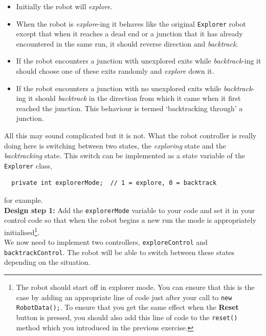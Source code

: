 \begin{itemize}

\item
Initially the robot will {\em explore}.

\item
When the robot is {\em explore}-ing it behaves like the original
{\tt Explorer} robot except that when it reaches a dead end or a junction
that it has already encountered in the same run, it should reverse direction
and {\em backtrack}.

\item
If the robot encounters a junction with unexplored exits while
{\em backtrack}-ing it should choose one of these exits randomly
and {\em explore} down it.

\item
If the robot encounters a junction with no unexplored exits while
{\em backtrack}-ing it should {\em backtrack} in the direction from which
it came when it first reached the junction. This behaviour is termed
`backtracking through' a junction.

\end{itemize}

\noindent
All this may sound complicated but it is not. What the robot controller is
really doing here is switching between two states, the {\em exploring}
state and the {\em backtracking} state. This switch can be implemented as
a state variable of the {\tt Explorer} class,

\begin{verbatim}
  private int explorerMode;  // 1 = explore, 0 = backtrack
\end{verbatim}

\noindent
for example. \\

\noindent
{\bf Design step 1:}
Add the {\tt explorerMode} variable to your code and set it in your
control code so that when the robot begins a new run the mode is
appropriately initialised\footnote{The robot should start off in explorer mode.
You can ensure that this is the case by adding an appropriate line of code just
after your call to {\tt new RobotData();}. To ensure that you get the same
effect when the {\bf Reset} button is pressed, you should also add this line
of code to the {\tt reset()} method which you introduced in the previous
exercise.}. \\

\noindent
We now need to implement two controllers,
{\tt exploreControl} and
{\tt backtrackControl}. The robot will be able to
switch between these states depending on the
situation. \\

